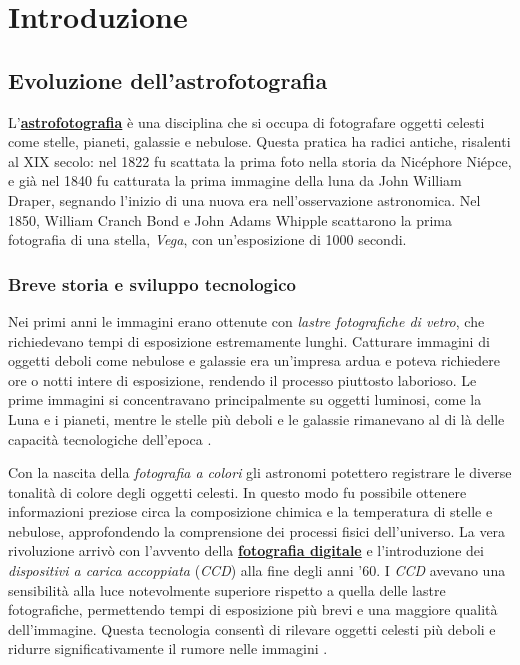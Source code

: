 \chapter{Introduzione} \label{chap:introduction}

\section{Evoluzione dell'astrofotografia} \label{sec:evolution}

L'\textbf{\href{https://it.wikipedia.org/wiki/Astrofotografia}{astrofotografia}} è una disciplina che si occupa di fotografare oggetti celesti come stelle, pianeti, galassie e nebulose. Questa pratica ha radici antiche, risalenti al XIX secolo: nel 1822 fu scattata la prima foto nella storia da Nicéphore Niépce, e già nel 1840 fu catturata la prima immagine della luna da John William Draper, segnando l'inizio di una nuova era nell'osservazione astronomica. Nel 1850, William Cranch Bond e John Adams Whipple scattarono la prima fotografia di una stella, \textit{Vega}, con un'esposizione di 1000 secondi.

\subsection{Breve storia e sviluppo tecnologico} \label{subsec:history}

Nei primi anni le immagini erano ottenute con \textit{lastre fotografiche di vetro}, che richiedevano tempi di esposizione estremamente lunghi. Catturare immagini di oggetti deboli come nebulose e galassie era un'impresa ardua e poteva richiedere ore o notti intere di esposizione, rendendo il processo piuttosto laborioso. Le prime immagini si concentravano principalmente su oggetti luminosi, come la Luna e i pianeti, mentre le stelle più deboli e le galassie rimanevano al di là delle capacità tecnologiche dell'epoca \cite{astroph_hist}.

Con la nascita della \textit{fotografia a colori} gli astronomi potettero registrare le diverse tonalità di colore degli oggetti celesti. In questo modo fu possibile ottenere informazioni preziose circa la composizione chimica e la temperatura di stelle e nebulose, approfondendo la comprensione dei processi fisici dell'universo. La vera rivoluzione arrivò con l'avvento della \textbf{\href{https://it.wikipedia.org/wiki/Fotografia_digitale}{fotografia digitale}} e l'introduzione dei \textit{dispositivi a carica accoppiata} (\textit{CCD}) alla fine degli anni '60. I \textit{CCD} avevano una sensibilità alla luce notevolmente superiore rispetto a quella delle lastre fotografiche, permettendo tempi di esposizione più brevi e una maggiore qualità dell'immagine. Questa tecnologia consentì di rilevare oggetti celesti più deboli e ridurre significativamente il rumore nelle immagini \cite{multiwavelength_image_proc}.

